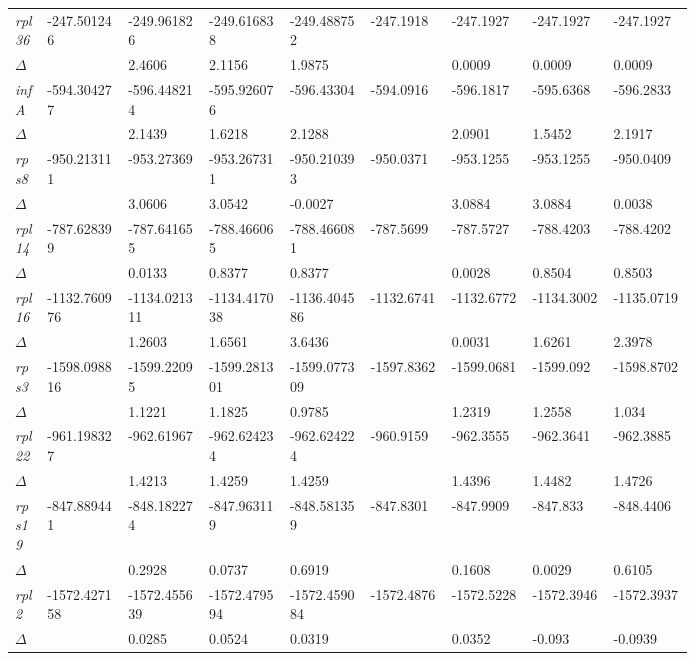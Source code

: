 \documentclass[a4paper]{article}
\begin{document}
\begin{longtable}{p{0.03\linewidth}|p{0.095\linewidth}p{0.095\linewidth}p{0.095\linewidth}p{0.095\linewidth}|p{0.095\linewidth}p{0.095\linewidth}p{0.095\linewidth}p{0.095\linewidth}}
 \rowcolor{black!20} \textit{rpl36} & -247.501246 & -249.961826 & -249.616838 & -249.488752 & -247.1918 & -247.1927 & -247.1927 & -247.1927\\
 \rowcolor{black!20} $\Delta$ &  & 2.4606 & 2.1156 & 1.9875 &  & 0.0009 & 0.0009 & 0.0009\\
\textit{infA} & -594.304277 & -596.448214 & -595.926076 & -596.43304 & -594.0916 & -596.1817 & -595.6368 & -596.2833\\
$\Delta$ &  & 2.1439 & 1.6218 & 2.1288 &  & 2.0901 & 1.5452 & 2.1917\\
 \rowcolor{black!20} \textit{rps8} & -950.213111 & -953.27369 & -953.267311 & -950.210393 & -950.0371 & -953.1255 & -953.1255 & -950.0409\\
 \rowcolor{black!20} $\Delta$ &  & 3.0606 & 3.0542 & -0.0027 &  & 3.0884 & 3.0884 & 0.0038\\
\textit{rpl14} & -787.628399 & -787.641655 & -788.466065 & -788.466081 & -787.5699 & -787.5727 & -788.4203 & -788.4202\\
$\Delta$ &  & 0.0133 & 0.8377 & 0.8377 &  & 0.0028 & 0.8504 & 0.8503\\
 \rowcolor{black!20} \textit{rpl16} & -1132.760976 & -1134.021311 & -1134.417038 & -1136.404586 & -1132.6741 & -1132.6772 & -1134.3002 & -1135.0719\\
 \rowcolor{black!20} $\Delta$ &  & 1.2603 & 1.6561 & 3.6436 &  & 0.0031 & 1.6261 & 2.3978\\
\textit{rps3} & -1598.098816 & -1599.22095 & -1599.281301 & -1599.077309 & -1597.8362 & -1599.0681 & -1599.092 & -1598.8702\\
$\Delta$ &  & 1.1221 & 1.1825 & 0.9785 &  & 1.2319 & 1.2558 & 1.034\\
 \rowcolor{black!20} \textit{rpl22} & -961.198327 & -962.61967 & -962.624234 & -962.624224 & -960.9159 & -962.3555 & -962.3641 & -962.3885\\
 \rowcolor{black!20} $\Delta$ &  & 1.4213 & 1.4259 & 1.4259 &  & 1.4396 & 1.4482 & 1.4726\\
\textit{rps19} & -847.889441 & -848.182274 & -847.963119 & -848.581359 & -847.8301 & -847.9909 & -847.833 & -848.4406\\
$\Delta$ &  & 0.2928 & 0.0737 & 0.6919 &  & 0.1608 & 0.0029 & 0.6105\\
 \rowcolor{black!20} \textit{rpl2} & -1572.427158 & -1572.455639 & -1572.479594 & -1572.459084 & -1572.4876 & -1572.5228 & -1572.3946 & -1572.3937\\
 \rowcolor{black!20} $\Delta$ &  & 0.0285 & 0.0524 & 0.0319 &  & 0.0352 & -0.093 & -0.0939\\

\end{longtable}
\end{document}
